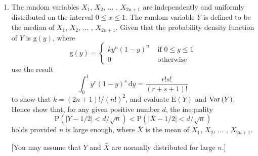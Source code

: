 \documentclass[a4, 11pt]{report}
\newlength{\qspace}
\newcounter{qnumber}
\newenvironment{question}%
 {\vspace{\qspace}
  \begin{enumerate}[\bfseries 1\quad][10]%
    \setcounter{enumi}{\value{qnumber}}%
    \item%
 }
{
  \end{enumerate}
  \filbreak
  \stepcounter{qnumber}
 }
\def\d{{\mathrm d}}
\def\g{{\mathrm g}}
\def\E{{\mathrm E}}
\def\P{{\mathrm P}}
\def\le{\leqslant}
\begin{document}
\begin{question}
The random variables $X_1$, $X_2$, $\ldots$ , $X_{2n+1}$ are 
independently and uniformly distributed on the interval
$0 \le x \le 1$.  The random variable $Y$ is defined to be the
median  of  $X_1$, $X_2$, $\ldots$ , $X_{2n+1}$. 
Given that the probability density function of $Y$ is $\g(y)$, where
\[
\mathrm{g}(y)=\begin{cases}
ky^{n}(1-y)^{n} & \mbox{ if }0\leqslant y\leqslant1\\
0 & \mbox{ otherwise}
\end{cases}
\]
use the result
$$
\int_0^1 {y^{r}}{{(1-y)}^{s}}\,\d y = 
\frac{r!s!}{(r+s+1)!}
$$
to show that $k={(2n+1)!}/{{(n!)}^2}$, and evaluate
$\E(Y)$ and ${\rm Var}\,(Y)$.
Hence show that, 
for any given positive number $d$, the inequality 
$$
{\P\left({\vert {Y - 1/2} \vert} < {d/{\sqrt {n}}} \right)} <
{\P\left({\vert {{\bar X} - 1/2} \vert} < {d/{\sqrt {n}}} \right)}
$$
holds provided $n$ is large enough, where
${\bar X}$ is the mean of  $X_1$, $X_2$, $\ldots$ , $X_{2n+1}$. 

[You may assume that $Y$ and $\bar X$ are normally distributed 
for large $n$.]
\end{question}
	
\end{document}
